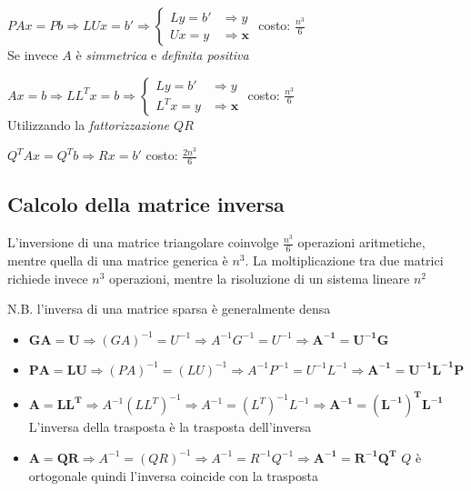 \documentclass[openany]{book}
\begin{document}
$PAx=Pb \Rightarrow LUx=b' \Rightarrow \left\{ \begin{array}{ll} Ly=b' & \Rightarrow y \\ Ux = y & \Rightarrow 
\boldsymbol{x} \end{array}\right.$ \qquad costo: $\frac{n^3}{6}$
\\

Se invece $A$ è \textit{simmetrica} e \textit{definita positiva}

$Ax=b \Rightarrow LL^Tx=b \Rightarrow \left\{ \begin{array}{ll} Ly=b' & \Rightarrow y \\ L^Tx = y & \Rightarrow
 \boldsymbol{x} \end{array}\right.$ \qquad costo: $\frac{n^3}{6}$
\\

Utilizzando la \textit{fattorizzazione $QR$}

$Q^TAx=Q^Tb \Rightarrow Rx=b'$ \qquad costo: $\frac{2n^3}{6}$
\subsection{Calcolo della matrice inversa}

L'inversione di una matrice triangolare coinvolge $\frac{n^3}{6}$ operazioni aritmetiche, mentre quella di una 
matrice generica è $n^3$. La moltiplicazione tra due matrici richiede invece $n^3$ operazioni, mentre la 
risoluzione di un sistema lineare $n^2$

N.B. l'inversa di una matrice sparsa è generalmente densa

\begin{itemize}
	\item $\boldsymbol{GA=U}\Rightarrow (GA)^{-1}=U^{-1}\Rightarrow A^{-1}G^{-1}=U^{-1}\Rightarrow 
	\boldsymbol{A^{-1}=U^{-1}G}$
	\item $\boldsymbol{PA=LU} \Rightarrow (PA)^{-1}=(LU)^{-1}\Rightarrow A^{-1}P^{-1}=U^{-1}L^{-1}\Rightarrow 
	\boldsymbol{A^{-1}=U^{-1}L^{-1}P}$
	\item $\boldsymbol{A=LL^T}\Rightarrow A^{-1}(LL^T)^{-1}\Rightarrow A^{-1}=(L^T)^{-1}L^{-1} \Rightarrow 
	\boldsymbol{A^{-1}=(L^{-1})^TL^{-1}}$ \quad L'inversa della trasposta è la trasposta dell'inversa 
	\item $\boldsymbol{A=QR}\Rightarrow A^{-1}=(QR)^{-1}\Rightarrow A^{-1}=R^{-1}Q^{-1} \Rightarrow 
	\boldsymbol{A^{-1}=R^{-1}Q^T}$ \quad $Q$ è ortogonale quindi l'inversa coincide con la trasposta
\end{itemize}
\end{document}
